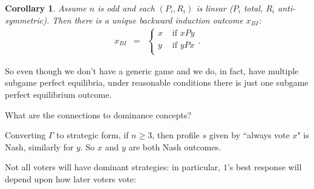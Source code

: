 \documentclass[12pt]{article}
\newtheorem{coro}[propo]{Corollary}
\newcommand{\n}{\noindent}
\newcommand{\s}{\vspace{5mm}}
\begin{document}
\s
\n
\begin{coro}  Assume $n$ is odd and each $(P_i,R_i)$ is linear ($P_i$ total, $R_i$ anti-symmetric).  Then there is a unique backward induction outcome $x_{BI}$:
\begin{eqnarray*}
x_{BI}&=&\left\{\begin{array}{cc}
x&\mbox{ if }xPy\\
y&\mbox{ if }yPx\\
\end{array}\right..
\end{eqnarray*}
\end{coro}

\s
\n  So even though we don't have a generic game and we do, in fact, have multiple subgame perfect equilibria, under reasonable conditions there is just one subgame perfect equilibrium outcome.  

\s
\n What are the connections to dominance concepts?

\s
\n Converting $\Gamma$ to strategic form, if $n\geq 3$, then profile $s$ given by ``always vote $x$" is Nash, similarly for $y$.  So $x$ and $y$ are both Nash outcomes.

\s
\n Not all voters will have dominant strategies: in particular, $1$'s best response will depend upon how later voters vote:
\end{document}
